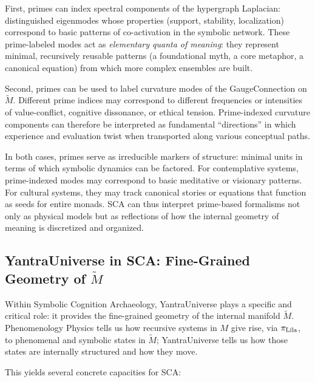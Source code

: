\documentclass[12]{amsart}
\theoremstyle{plain}
\begin{document}
First, primes can index spectral components of the hypergraph Laplacian: distinguished eigenmodes whose properties (support, stability, localization) correspond to basic patterns of co-activation in the symbolic network. These prime-labeled modes act as \emph{elementary quanta of meaning}: they represent minimal, recursively reusable patterns (a foundational myth, a core metaphor, a canonical equation) from which more complex ensembles are built.

Second, primes can be used to label curvature modes of the GaugeConnection on $\tilde M$. Different prime indices may correspond to different frequencies or intensities of value-conflict, cognitive dissonance, or ethical tension. Prime-indexed curvature components can therefore be interpreted as fundamental ``directions'' in which experience and evaluation twist when transported along various conceptual paths.

In both cases, primes serve as irreducible markers of structure: minimal units in terms of which symbolic dynamics can be factored. For contemplative systems, prime-indexed modes may correspond to basic meditative or visionary patterns. For cultural systems, they may track canonical stories or equations that function as seeds for entire monads. SCA can thus interpret prime-based formalisms not only as physical models but as reflections of how the internal geometry of meaning is discretized and organized.

\subsection{YantraUniverse in SCA: Fine-Grained Geometry of $\tilde M$}

Within Symbolic Cognition Archaeology, YantraUniverse plays a specific and critical role: it provides the fine-grained geometry of the internal manifold $\tilde M$. Phenomenology Physics tells us how recursive systems in $M$ give rise, via $\pi_{\text{L\={\i}la}}$, to phenomenal and symbolic states in $\tilde M$; YantraUniverse tells us how those states are internally structured and how they move.

This yields several concrete capacities for SCA:
\end{document}
